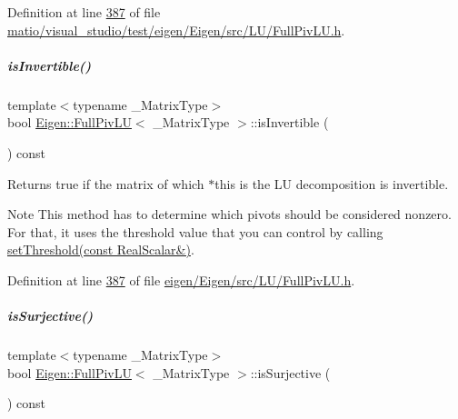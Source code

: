 Definition at line \hyperlink{matio_2visual__studio_2test_2eigen_2_eigen_2src_2_l_u_2_full_piv_l_u_8h_source_l00387}{387} of file \hyperlink{matio_2visual__studio_2test_2eigen_2_eigen_2src_2_l_u_2_full_piv_l_u_8h_source}{matio/visual\+\_\+studio/test/eigen/\+Eigen/src/\+L\+U/\+Full\+Piv\+L\+U.\+h}.

\mbox{\label{group___l_u___module_afdf2579c93473650f2ef2a47a376c4a0}} 
\subparagraph{\texorpdfstring{is\+Invertible()}{isInvertible()}\hspace{0.1cm}{\footnotesize\ttfamily [2/2]}}
{\footnotesize\ttfamily template$<$typename \+\_\+\+Matrix\+Type$>$ \\
bool \hyperlink{group___l_u___module_class_eigen_1_1_full_piv_l_u}{Eigen\+::\+Full\+Piv\+LU}$<$ \+\_\+\+Matrix\+Type $>$\+::is\+Invertible (\begin{DoxyParamCaption}{ }\end{DoxyParamCaption}) const\hspace{0.3cm}{\ttfamily [inline]}}

\begin{DoxyReturn}{Returns}
true if the matrix of which $\ast$this is the LU decomposition is invertible.
\end{DoxyReturn}
\begin{DoxyNote}{Note}
This method has to determine which pivots should be considered nonzero. For that, it uses the threshold value that you can control by calling \hyperlink{group___l_u___module_a414592d82de98f5bd075965caf56d681}{set\+Threshold(const Real\+Scalar\&)}. 
\end{DoxyNote}


Definition at line \hyperlink{eigen_2_eigen_2src_2_l_u_2_full_piv_l_u_8h_source_l00387}{387} of file \hyperlink{eigen_2_eigen_2src_2_l_u_2_full_piv_l_u_8h_source}{eigen/\+Eigen/src/\+L\+U/\+Full\+Piv\+L\+U.\+h}.

\mbox{\label{group___l_u___module_a1f6222875fc3a181ee1544b9b36dfda5}} 
\subparagraph{\texorpdfstring{is\+Surjective()}{isSurjective()}\hspace{0.1cm}{\footnotesize\ttfamily [1/2]}}
{\footnotesize\ttfamily template$<$typename \+\_\+\+Matrix\+Type$>$ \\
bool \hyperlink{group___l_u___module_class_eigen_1_1_full_piv_l_u}{Eigen\+::\+Full\+Piv\+LU}$<$ \+\_\+\+Matrix\+Type $>$\+::is\+Surjective (\begin{DoxyParamCaption}{ }\end{DoxyParamCaption}) const\hspace{0.3cm}{\ttfamily [inline]}}

